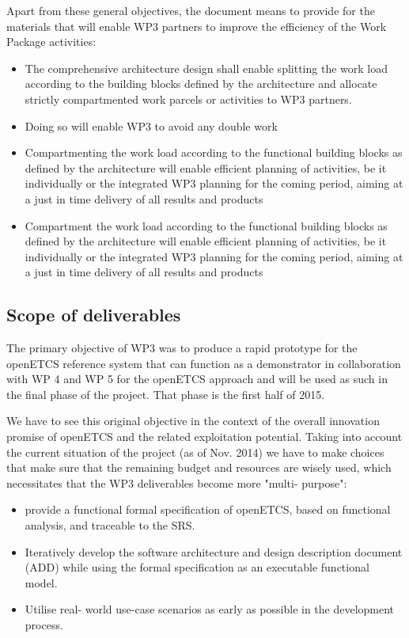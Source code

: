 Apart from these general objectives, the document means to provide for the materials that will enable WP3 partners to improve the efficiency of the Work Package activities:
\begin{itemize}
\item The comprehensive architecture design shall enable splitting the work load according to the building blocks defined by the architecture and allocate strictly compartmented work parcels or activities to WP3 partners.
\item Doing so will enable WP3 to avoid any double work
\item  Compartmenting the work load according to the functional building blocks as defined by the architecture will enable efficient planning of activities, be it individually or the integrated WP3 planning for the coming period, aiming at a just in time delivery of all results and products
\item  Compartment the work load according to the functional building blocks as defined by the architecture will enable efficient planning of activities, be it individually or the integrated WP3 planning for the coming period, aiming at a just in time delivery of all results and products
\end{itemize}



\subsection{Scope of deliverables}

The primary objective of WP3 was to produce a rapid prototype for the openETCS reference system that can function as a demonstrator in collaboration with WP 4 and WP 5  for the openETCS approach and will be used as such in the final phase of the project. That phase is the first half of 2015.

We have to see this original objective in the context of the overall innovation promise of openETCS and the related exploitation potential.
Taking into account the current situation of the project (as of Nov. 2014) we have to make choices that make sure that the remaining budget and resources are wisely used, which necessitates that the WP3 deliverables become more "multi- purpose":

\begin{itemize}
\item provide a functional formal specification of openETCS, based on functional analysis, and traceable to the SRS.
 
\item Iteratively develop the software architecture and design description document (ADD) while using the formal specification as an executable functional model.
 
\item Utilise real- world use-case scenarios as early as possible in the development process.
\end{itemize}
 

